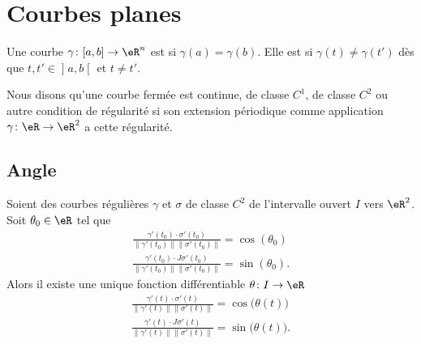 \section{Courbes planes}

\begin{definition}
	Une courbe \( \gamma\colon \mathopen[ a , b \mathclose]\to \eR^n\) est  si \( \gamma(a)=\gamma(b)\). Elle est  si \( \gamma(t)\neq \gamma(t')\) dès que \( t,t'\in\mathopen] a , b \mathclose[\) et \( t\neq  t'\).
\end{definition}

\begin{definition}      \label{DEFooSAZTooZGQrQG}
	Nous disons qu'une courbe fermée est continue, de classe \( C^1\), de classe \( C^2\) ou autre condition de régularité si son extension périodique comme application \( \gamma\colon \eR\to \eR^2\) a cette régularité.
\end{definition}

\subsection{Angle}

\begin{lemma}        \label{LEMooUECMooNBDGiR}
	Soient des courbes régulières \( \gamma\) et \( \sigma\) de classe \( C^2\) de l'intervalle ouvert \( I\) vers \( \eR^2\). Soit \( \theta_0\in \eR\) tel que
	\begin{subequations}
		\begin{align}
			\frac{ \gamma'(t_0)\cdot\sigma'(t_0) }{ \| \gamma'(t_0) \|\| \sigma'(t_0) \| }=\cos(\theta_0) \\
			\frac{ \gamma'(t_0)\cdot J\sigma'(t_0) }{ \| \gamma'(t_0) \|\| \sigma'(t_0) \| }=\sin(\theta_0).
		\end{align}
	\end{subequations}
	Alors il existe une unique fonction différentiable \( \theta\colon I\to \eR\)
	\begin{subequations}
		\begin{align}
			\frac{ \gamma'(t)\cdot\sigma'(t) }{ \| \gamma'(t) \|\| \sigma'(t) \| }=\cos\big( \theta(t) \big) \\
			\frac{ \gamma'(t)\cdot J\sigma'(t) }{ \| \gamma'(t) \|\| \sigma'(t) \| }=\sin\big( \theta(t) \big).
		\end{align}
	\end{subequations}
\end{lemma}

